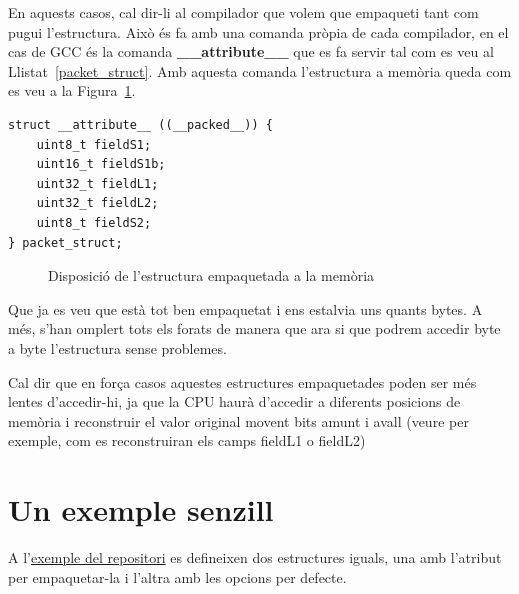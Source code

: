 En aquests casos, cal dir-li al compilador que volem que empaqueti tant com pugui l'estructura. Això és fa amb una comanda pròpia de cada compilador, en el cas de GCC és la comanda {\bf \_\_attribute\_\_} que es fa servir tal com es veu al Llistat~\ref{packet_struct}. Amb aquesta comanda l'estructura a memòria queda com es veu  a la Figura~\ref{fig:UnpackedMemoryStructure}.


\begin{lstlisting}[style=customc,caption={Estructura d'exemple empaquetada},label=packet_struct]
struct __attribute__ ((__packed__)) {
	uint8_t fieldS1;
	uint16_t fieldS1b;
	uint32_t fieldL1;
	uint32_t fieldL2;
	uint8_t fieldS2;
} packet_struct;
\end{lstlisting}


\begin{figure}
 \centering
 \caption{Disposició de l'estructura empaquetada a la memòria}
 \label{fig:UnpackedMemoryStructure}
\end{figure}

Que ja es veu que està tot ben empaquetat i ens estalvia uns quants bytes. A més, s'han omplert tots els forats de manera que ara si que podrem accedir byte a byte l'estructura sense problemes.

Cal dir que en força casos aquestes estructures empaquetades poden ser més lentes d'accedir-hi, ja que la CPU haurà d'accedir a diferents posicions de memòria i reconstruir el valor original movent bits amunt i avall (veure per exemple, com es reconstruiran els camps fieldL1 o fieldL2)

\section{Un exemple senzill}

A l'\href{https://github.com/mariusmm/cursembedded/tree/master/Simplicity/Structures}{exemple del repositori} es defineixen dos estructures iguals, una amb l'atribut per empaquetar-la i l'altra amb les opcions per defecte.

